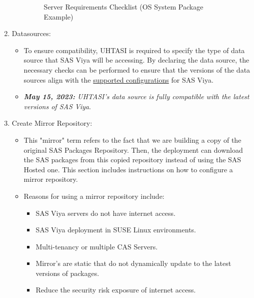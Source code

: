 \begin{enumerate}
\begin{itemize}
\begin{figure}[H]
\begin{center}
\begin{tabular}
            \end{tabular}
        \end{center}
        \caption{Server Requirements Checklist (OS System Package Example)}
        \label{SRC-example}
        \end{figure}
    \end{itemize}
    \item Datasources:
    \begin{itemize}
        \item To ensure compatibility, UHTASI is required to specify the type of data source that SAS Viya will be accessing. By declaring the data source, the necessary checks can be performed to ensure that the versions of the data sources align with the \href{https://support.sas.com/en/documentation/third-party-software-reference/viya/35/support-for-databases.html}{supported configurations} for SAS Viya.
    \item \emph{\textbf{May 15, 2023:} UHTASI's data source is fully compatible with the latest versions of SAS Viya}.
    \end{itemize}
    \item Create Mirror Repository:
    \begin{itemize}
        \item This "mirror" term refers to the fact that we are building a copy of the original SAS Packages Repository. Then, the deployment can download the SAS packages from this copied repository instead of using the SAS Hosted one. This section includes instructions on how to configure a mirror repository.
        \item Reasons for using a mirror repository include: 
        \begin{itemize}
            \item SAS Viya servers do not have internet access.
            \item SAS Viya deployment in SUSE Linux environments.
            \item Multi-tenancy or multiple CAS Servers.
            \item Mirror's are static that do not dynamically update to the latest versions of packages.
            \item Reduce the security risk exposure of internet access.
        \end{itemize}
    \end{itemize}
\end{enumerate}

